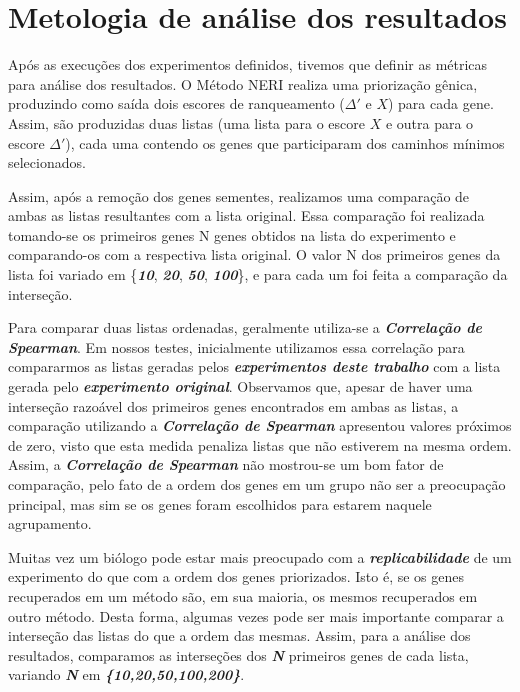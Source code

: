 \section{Metologia de análise dos resultados}

Após as execuções dos experimentos definidos, tivemos que definir as métricas para análise dos resultados.
O Método NERI realiza uma priorização gênica, produzindo como saída dois escores de ranqueamento ($\Delta'$ e $X$) para cada gene.
Assim, são produzidas duas listas (uma lista para o escore $X$ e outra para o escore $\Delta'$), cada uma contendo os genes que participaram dos caminhos mínimos selecionados. 

Assim, após a remoção dos genes sementes, realizamos uma comparação de ambas as listas resultantes com a lista original.
Essa comparação foi realizada tomando-se os primeiros genes N genes obtidos na lista do experimento e comparando-os com a respectiva lista original.
O valor N dos primeiros genes da lista foi variado em \{\textsl{\textbf{10}}, \textsl{\textbf{20}}, \textsl{\textbf{50}}, \textsl{\textbf{100}}\}, e para cada um foi feita a comparação da interseção.


Para comparar duas listas ordenadas, geralmente utiliza-se a \textsl{\textbf{Correlação de Spearman}}.
Em nossos testes, inicialmente utilizamos essa correlação para compararmos as listas geradas pelos \textsl{\textbf{experimentos deste trabalho}} com a lista gerada pelo \textsl{\textbf{experimento original}}.
%
Observamos que, apesar de haver uma interseção razoável dos primeiros genes encontrados em ambas as listas,  a comparação utilizando a \textsl{\textbf{Correlação de Spearman}} apresentou valores próximos de zero, visto que esta medida penaliza listas que não estiverem na mesma ordem.
%
Assim, a \textsl{\textbf{Correlação de Spearman}} não mostrou-se um bom fator de comparação, pelo fato de a ordem dos genes em um grupo não ser a preocupação principal, mas sim se os genes foram escolhidos para estarem naquele agrupamento.


Muitas vez um biólogo pode estar mais preocupado com a \textsl{\textbf{replicabilidade}} de um experimento do que com a ordem dos genes priorizados.
Isto é, se os genes recuperados em um método são, em sua maioria, os mesmos recuperados em outro método.
Desta forma, algumas vezes pode ser mais importante comparar a interseção das listas do que a ordem das mesmas.
Assim, para a análise dos resultados, comparamos as interseções dos \textsl{\textbf{N}} primeiros genes de cada lista, variando \textsl{\textbf{N}} em \textsl{\textbf{\{10,20,50,100,200\}}}.



